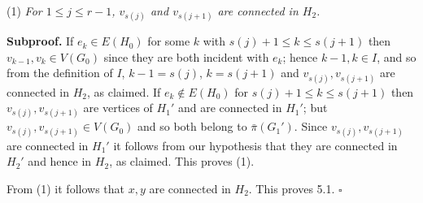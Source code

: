 \hspace*{12pt}(1) \textit{For $1 \le j \le r - 1$, $v_{s(j)}$ and $v_{s(j+1)}$ are connected in $H_2$.}

\textbf{Subproof.} If $e_k \in E(H_0)$ for some $k$ with $s(j) + 1 \le k \le s(j + 1)$ then $v_{k-1}, v_k \in V(G_0)$ since they are both incident with $e_k$; hence $k - 1, k \in I$, and so from the definition of $I$, $k - 1 = s(j)$, $k = s(j + 1)$ and $v_{s(j)}, v_{s(j+1)}$ are connected in $H_2$, as claimed. If $e_k \notin E(H_0)$ for $s(j) + 1 \le k \le s(j + 1)$ then $v_{s(j)}, v_{s(j+1)}$ are vertices of $H_1'$ and are connected in $H_1'$; but $v_{s(j)}, v_{s(j+1)} \in V(G_0)$ and so both belong to $\bar{\pi}(G_1')$. Since $v_{s(j)}, v_{s(j+1)}$ are connected in $H_1'$ it follows from our hypothesis that they are connected in $H_2'$ and hence in $H_2$, as claimed. This proves (1).

From (1) it follows that $x, y$ are connected in $H_2$. This proves 5.1. $\square$

